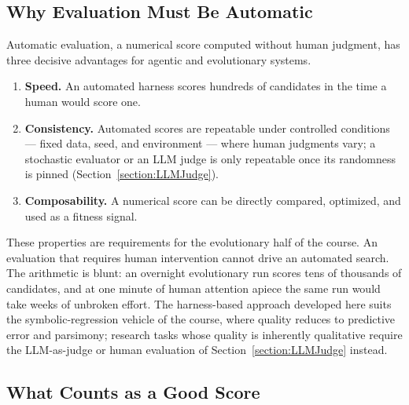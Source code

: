 \subsection{Why Evaluation Must Be Automatic}

Automatic evaluation, a numerical score computed without human judgment, has three decisive advantages for agentic and evolutionary systems.
\begin{enumerate}
\item \textbf{Speed.} An automated harness scores hundreds of candidates in the time a human would score one.
\item \textbf{Consistency.} Automated scores are repeatable under controlled conditions --- fixed data, seed, and environment --- where human judgments vary; a stochastic evaluator or an LLM judge is only repeatable once its randomness is pinned (Section~\ref{section:LLMJudge}).
\item \textbf{Composability.} A numerical score can be directly compared, optimized, and used as a fitness signal.
\end{enumerate}
These properties are requirements for the evolutionary half of the course.
An evaluation that requires human intervention cannot drive an automated search.
The arithmetic is blunt: an overnight evolutionary run scores tens of thousands of candidates, and at one minute of human attention apiece the same run would take weeks of unbroken effort.
The harness-based approach developed here suits the symbolic-regression vehicle of the course, where quality reduces to predictive error and parsimony; research tasks whose quality is inherently qualitative require the LLM-as-judge or human evaluation of Section~\ref{section:LLMJudge} instead.

\subsection{What Counts as a Good Score}

